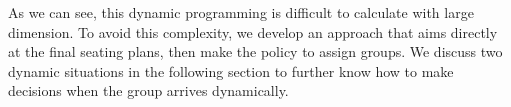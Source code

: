 As we can see, this dynamic programming is difficult to calculate with large dimension. To avoid this complexity, we develop an approach that aims directly at the final seating plans, then make the policy to assign groups. We discuss two dynamic situations in the following section to further know how to make decisions when the group arrives dynamically.




